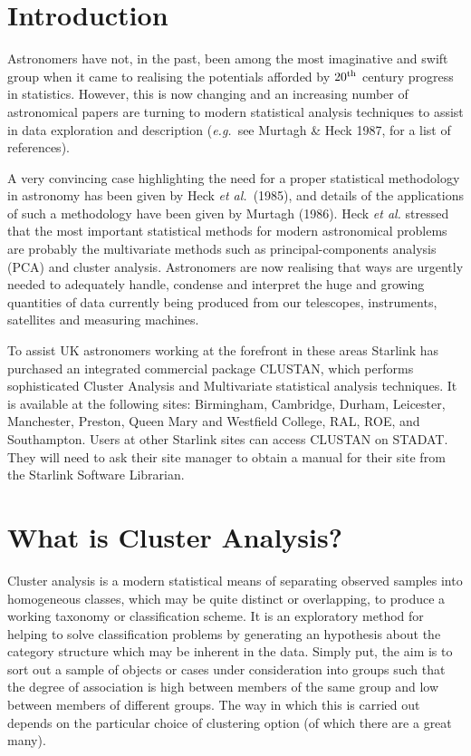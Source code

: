 
\section{Introduction}
Astronomers have not, in the past, been among the most imaginative and
swift group when it came to realising the potentials afforded by
$20^{\rm th}$ century progress in statistics. However, this is now
changing and an increasing number of astronomical papers are
turning to modern statistical analysis techniques to assist in data exploration
and description ({\it e.g.}\ see Murtagh \& Heck 1987, for a list of 
references). 

A very convincing case highlighting the need for a proper statistical
methodology in astronomy has been given by Heck {\it et al.}\ (1985),
and details of the applications of such a methodology have been given by
Murtagh (1986). Heck {\it et al.} stressed that the most important
statistical methods for modern astronomical problems are probably the
multivariate methods such as principal-components analysis (PCA) and
cluster analysis. Astronomers are now realising that ways are urgently
needed to adequately handle, condense and interpret the huge and growing
quantities of data currently being produced from our telescopes,
instruments, satellites and measuring machines. 

To assist UK astronomers working at the forefront in these areas
Starlink has purchased an integrated commercial package {\small
CLUSTAN}, which performs sophisticated Cluster Analysis and Multivariate
statistical analysis techniques. It is available at the following sites:
Birmingham, Cambridge, Durham, Leicester, Manchester, Preston, Queen
Mary and Westfield College, RAL, ROE, and Southampton.  Users at other
Starlink sites can access {\small CLUSTAN} on STADAT.  They will need to
ask their site manager to obtain a manual for their site from the
Starlink Software Librarian. 

\section{What is Cluster Analysis?}
Cluster analysis is a modern statistical means of separating
observed samples into homogeneous classes, which may be quite distinct
or overlapping, to produce a working taxonomy or classification scheme.
It is an exploratory method for helping to solve classification problems by
generating an hypothesis about the category structure which may be
inherent in the data. Simply put, the aim is to sort out a sample of
objects or cases under consideration into groups such that the degree of
association is high between members of the same group and low between
members of different groups. The way in which this is carried out
depends on the particular choice of clustering option (of which there
are a great many). 

